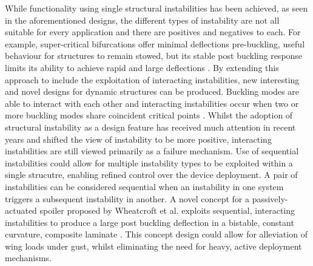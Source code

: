 \documentclass{IEEEtran}
\begin{document}
        While functionality using single structural instabilities has been achieved, as seen in the aforementioned designs, the different types of instability are not all suitable for every application and there are positives and negatives to each. For example, super-critical bifurcations offer minimal deflections pre-buckling, useful behaviour for structures to remain stowed, but its stable post buckling response limits its ability to achieve rapid and large deflections \cite{Wheatcroft_2023}. By extending this approach to include the exploitation of interacting instabilities, new interesting and novel designs for dynamic structures can be produced. Buckling modes are able to interact with each other and interacting instabilities occur when two or more buckling modes share coincident critical points \cite{Wheatcroft_2023}. Whilst the adoption of structural instability as a design feature has received much attention in recent years and shifted the view of instability to be more positive, interacting instabilities are still viewed primarily as a failure mechanism. Use of sequential instabilities could allow for multiple instability types to be exploited within a single strucutre, enabling refined control over the device deployment. A pair of instabilities can be considered sequential when an instability in one system triggers a subsequent instability in another. A novel concept for a passively-actuated spoiler proposed by Wheatcroft et al. exploits sequential, interacting instabilities to produce a large post buckling deflection in a bistable, constant curvature, composite laminate \cite{Wheatcroft_2023}. This concept design could allow for alleviation of wing loads under gust, whilst eliminating the need for heavy, active deployment mechanisms.
		
\end{document}
